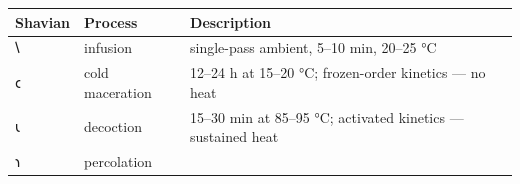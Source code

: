 \documentclass[12pt,a4paper]{article}
\begin{document}
\begin{longtable}[]{@{}lll@{}}
\toprule
\begin{minipage}[b]{0.30\columnwidth}\raggedright
Shavian\strut
\end{minipage} & \begin{minipage}[b]{0.30\columnwidth}\raggedright
Process\strut
\end{minipage} & \begin{minipage}[b]{0.30\columnwidth}\raggedright
Description\strut
\end{minipage}\tabularnewline
\midrule
\endhead
\begin{minipage}[t]{0.30\columnwidth}\raggedright
𐑘\strut
\end{minipage} & \begin{minipage}[t]{0.30\columnwidth}\raggedright
infusion\strut
\end{minipage} & \begin{minipage}[t]{0.30\columnwidth}\raggedright
single-pass ambient, 5--10 min, 20--25 °C\strut
\end{minipage}\tabularnewline
\begin{minipage}[t]{0.30\columnwidth}\raggedright
𐑤\strut
\end{minipage} & \begin{minipage}[t]{0.30\columnwidth}\raggedright
cold maceration\strut
\end{minipage} & \begin{minipage}[t]{0.30\columnwidth}\raggedright
12--24 h at 15--20 °C; frozen-order kinetics --- no heat\strut
\end{minipage}\tabularnewline
\begin{minipage}[t]{0.30\columnwidth}\raggedright
𐑧\strut
\end{minipage} & \begin{minipage}[t]{0.30\columnwidth}\raggedright
decoction\strut
\end{minipage} & \begin{minipage}[t]{0.30\columnwidth}\raggedright
15--30 min at 85--95 °C; activated kinetics --- sustained heat\strut
\end{minipage}\tabularnewline
\begin{minipage}[t]{0.30\columnwidth}\raggedright
𐑪\strut
\end{minipage} & \begin{minipage}[t]{0.30\columnwidth}\raggedright
percolation\strut
\end{minipage} & \begin{minipage}[t]{0.30\columnwidth}\raggedright

\end{minipage}
\end{longtable}
\end{document}
